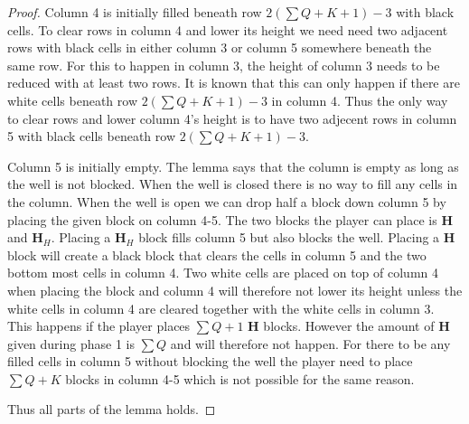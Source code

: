 \begin{proof}
Column 4 is initially filled beneath row $2 \left( \sum Q + K + 1 \right) - 3$ with black cells. To clear rows in column 4 and lower its height we need need two adjacent rows with black cells in either column 3 or column 5 somewhere beneath the same row. For this to happen in column 3, the height of column 3 needs to be reduced with at least two rows. It is known that this can only happen if there are white cells beneath row $2 \left( \sum Q + K + 1 \right) - 3$ in column 4. Thus the only way to clear rows and lower column 4's height is to have two adjecent rows in column 5 with black cells beneath row $2 \left( \sum Q + K + 1 \right) - 3$.

Column 5 is initially empty. The lemma says that the column is empty as long as the well is not blocked. When the well is closed there is no way to fill any cells in the column. When the well is open we can drop half a block down column 5 by placing the given block on column 4-5. The two blocks the player can place is $\mathbf{H}$ and $\mathbf{H}_H$. Placing a $\mathbf{H}_H$ block fills column 5 but also blocks the well. Placing a $\mathbf{H}$ block will create a black block that clears the cells in column 5 and the two bottom most cells in column 4. Two white cells are placed on top of column 4 when placing the block and column 4 will therefore not lower its height unless the white cells in column 4 are cleared together with the white cells in column 3. This happens if the player places $\sum Q + 1$ $\mathbf{H}$ blocks. However the amount of $\mathbf{H}$ given during phase 1 is $\sum Q$ and will therefore not happen. For there to be any filled cells in column 5 without blocking the well the player need to place $\sum Q + K$ blocks in column 4-5 which is not possible for the same reason.

Thus all parts of the lemma holds.
\end{proof}

